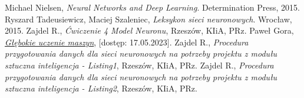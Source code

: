 \documentclass{article}
\begin{document}
\newpage
\begin{thebibliography}{9}
    Michael Nielsen,
    \emph{Neural Networks and Deep Learning}.
    Determination Press,
    2015.
    Ryszard Tadeusiewicz, Maciej Szaleniec,
    \emph{Leksykon sieci neuronowych}.
    Wrocław,
    2015.
    Zajdel R.,
    \emph{Ćwiczenie 4 Model Neuronu},
    Rzeszów,
    KIiA, PRz.
    Paweł Gora,
    \href{https://www.deltami.edu.pl/temat/informatyka/sztuczna_inteligencja/2017/12/28/Glebokie_uczenie_maszyn/}{\emph{Głębokie uczenie maszyn}},
    [dostęp: 17.05.2023].
    Zajdel R.,
    \emph{Procedura przygotowania danych dla sieci neuronowych na potrzeby projektu z modułu sztuczna inteligencja - Listing1},
    Rzeszów,
    KIiA, PRz.
    Zajdel R.,
    \emph{Procedura przygotowania danych dla sieci neuronowych na potrzeby projektu z modułu sztuczna inteligencja - Listing2},
    Rzeszów,
    KIiA, PRz.
\end{thebibliography}
\end{document}
